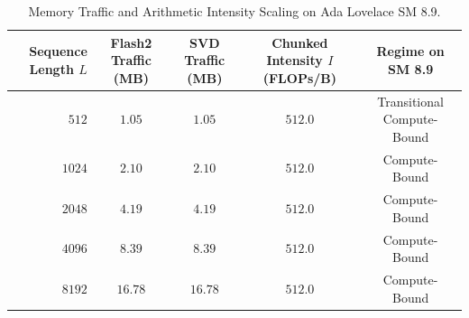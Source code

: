 \documentclass[journal]{IEEEtran}
\begin{document}
\begin{table}[h]
\centering
\caption{Memory Traffic and Arithmetic Intensity Scaling on Ada Lovelace SM 8.9.}
\label{tab:arithmetic_intensity}
\begin{tabular}{rcccc}
\toprule
\textbf{Sequence Length} $L$ & \textbf{Flash2 Traffic} (MB) & \textbf{SVD Traffic} (MB) & \textbf{Chunked Intensity} $I$ (FLOPs/B) & \textbf{Regime on SM 8.9} \\
\midrule
$512$ & $1.05$ & $1.05$ & $512.0$ & Transitional Compute-Bound \\
$1024$ & $2.10$ & $2.10$ & $512.0$ & Compute-Bound \\
$2048$ & $4.19$ & $4.19$ & $512.0$ & Compute-Bound \\
$4096$ & $8.39$ & $8.39$ & $512.0$ & Compute-Bound \\
$8192$ & $16.78$ & $16.78$ & $512.0$ & Compute-Bound \\
\bottomrule
\end{tabular}
\end{table}
\end{document}
